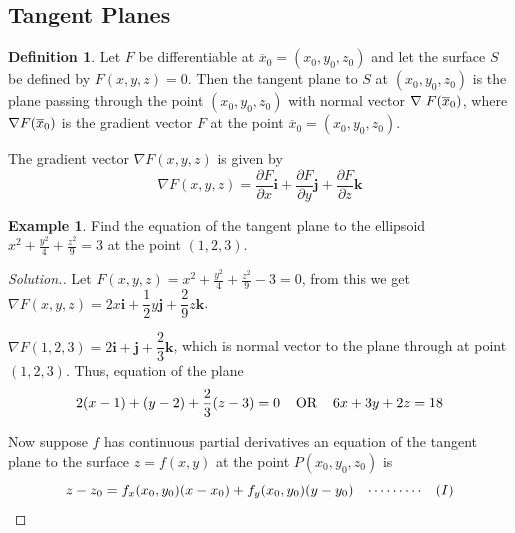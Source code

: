 \documentclass[11pt,a4paper]{article}
\theoremstyle{definition}
\newtheorem{defn}[thm]{Definition}
\newtheorem{exa}[thm]{Example}
\newenvironment{solution}
  {\renewcommand{\qedsymbol}{}\begin{proof}[\textit{Solution}.]}
  {\end{proof}}
\begin{document}
\subsection{Tangent Planes}

\begin{defn}


Let $F$ be differentiable at $\overline{x}_0 = (x_0,y_0,z_0)$ and let the surface $S$ be defined by $F(x,y,z) = 0$. Then the tangent plane to $S$ at $(x_0,y_0,z_0)$ is the plane passing through the point $(x_0,y_0,z_0)$ with normal vector $\nabla \hspace{0.1cm}F(\overline{x}_0)$, where $\nabla \hspace{0.0cm}F(\overline{x}_0)$ is the gradient vector $F$ at the point $\overline{x}_0 = (x_0,y_0,z_0)$.



The gradient vector $\nabla F(x,y,z)$ is given by $$\nabla F(x,y,z) = \frac{\partial F}{\partial x} \textbf{i} + \frac{\partial F}{\partial y} \textbf{j} + \frac{\partial F}{\partial z} \textbf{k}$$
\end{defn}


\begin{exa}


Find the equation of the tangent plane to the ellipsoid $\displaystyle{x^2 + \frac{y^2}{4} + \frac{z^2}{9} = 3}$ at the point $(1,2,3)$.
\end{exa}


\begin{solution}


Let $\displaystyle{F(x,y,z)  = x^2 + \frac{y^2}{4} + \frac{z^2}{9} - 3 = 0}$, from this we get $\displaystyle{\nabla F(x,y,z) = 2x\textbf{i} + \dfrac{1}{2}y\textbf{j} + \dfrac{2}{9}z\textbf{k}}$.


$\displaystyle{\nabla F(1, 2, 3) = 2\textbf{i} + \textbf{j} + \dfrac{2}{3}\textbf{k}}$, which is normal vector to the plane through at point $(1,2,3)$. Thus, equation of the plane 
$$2(x -1)  + (y - 2) + \dfrac{2}{3}(z - 3) = 0 \hspace{0.4cm}\text{OR}\hspace{0.4cm} 6x + 3y + 2z = 18$$


Now suppose $f$ has continuous partial derivatives an equation of the tangent plane to the surface $z = f(x,y)$ at the point $P(x_0,y_0,z_0)$ is $$z - z_0 = f_x(x_0,y_0)(x - x_0) + f_y(x_0,y_0)(y - y_0)\hspace{0.3cm}\cdots\cdots\cdots\hspace{0.3cm} (I)$$
\end{solution}
\end{document}
